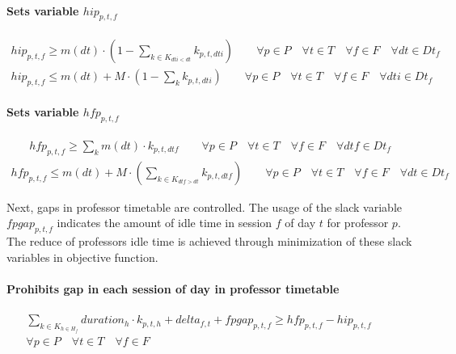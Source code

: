 \paragraph{Sets variable $hip_{p,t,f}$}
\begin{eqnarray}
hip_{p,t,f} \geq m(dt) \cdot ( 1 - \sum\limits_{k \in K_{dti<dt}} k_{p,t,dti} ) \nonumber \qquad
\forall p \in P \quad
\forall t \in T \quad
\forall f \in F \quad
\forall dt \in Dt_{f}
\end{eqnarray}
\begin{eqnarray}
hip_{p,t,f} \leq m(dt) + M \cdot ( 1 - \sum\limits_{k} k_{p,t,dti} ) \nonumber \qquad
\forall p \in P \quad
\forall t \in T \quad
\forall f \in F \quad
\forall dti \in Dt_{f}
\end{eqnarray}

\paragraph{Sets variable $hfp_{p,t,f}$}
\begin{eqnarray}
hfp_{p,t,f} \geq \sum\limits_{k} m(dt) \cdot k_{p,t,dtf} \nonumber \qquad
\forall p \in P \quad
\forall t \in T \quad
\forall f \in F \quad
\forall dtf \in Dt_{f}
\end{eqnarray}
\begin{eqnarray}
hfp_{p,t,f} \leq m(dt) + M \cdot ( \sum\limits_{k \in K_{dtf>dt}} k_{p,t,dtf} ) \nonumber \qquad
\forall p \in P \quad
\forall t \in T \quad
\forall f \in F \quad
\forall dt \in Dt_{f}
\end{eqnarray}

Next, gaps in professor timetable are controlled. The usage of the slack variable $fpgap_{p,t,f}$ indicates the amount of idle time in session $f$ of day $t$ for professor $p$. The reduce of professors idle time is achieved through minimization of these slack variables in objective function.

\paragraph{Prohibits gap in each session of day in professor timetable}
\begin{eqnarray}
\sum\limits_{k \in K_{h \in H_{f}}} duration_{h} \cdot k_{p,t,h} + delta_{f,t} + fpgap_{p,t,f} \geq hfp_{p,t,f} - hip_{p,t,f} \nonumber \qquad
\\
\forall p \in P \quad
\forall t \in T \quad
\forall f \in F \quad
\end{eqnarray}


